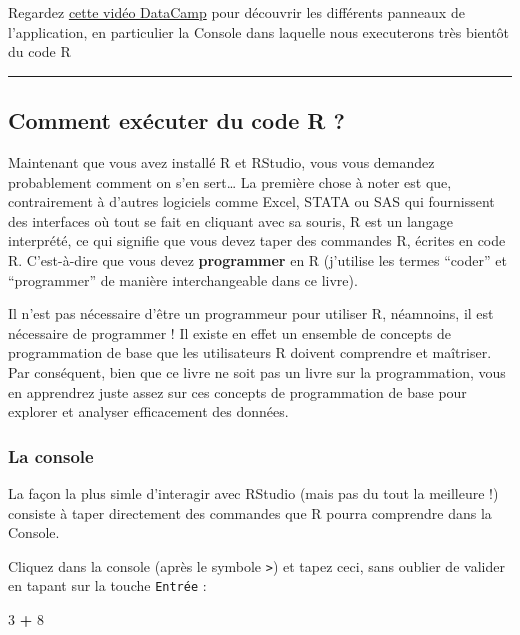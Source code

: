 \documentclass[a4paperpaper,]{article}
\newenvironment{Shaded}{\begin{snugshade}}{\end{snugshade}}
\newcommand{\DecValTok}[1]{\textcolor[rgb]{0.00,0.00,0.81}{#1}}
\newcommand{\StringTok}[1]{\textcolor[rgb]{0.31,0.60,0.02}{#1}}
\newcommand{\OperatorTok}[1]{\textcolor[rgb]{0.81,0.36,0.00}{\textbf{#1}}}
\theoremstyle{definition}
\theoremstyle{definition}
\theoremstyle{definition}
\theoremstyle{remark}
\begin{document}
Regardez
\href{https://campus.datacamp.com/courses/working-with-the-rstudio-ide-part-1/orientation?ex=5}{cette
vidéo DataCamp} pour découvrir les différents panneaux de l'application,
en particulier la Console dans laquelle nous executerons très bientôt du
code R

\begin{center}\rule{0.5\linewidth}{\linethickness}\end{center}

\subsection{Comment exécuter du code R ?}\label{code}

Maintenant que vous avez installé R et RStudio, vous vous demandez
probablement comment on s'en sert\ldots{} La première chose à noter est
que, contrairement à d'autres logiciels comme Excel, STATA ou SAS qui
fournissent des interfaces où tout se fait en cliquant avec sa souris, R
est un langage interprété, ce qui signifie que vous devez taper des
commandes R, écrites en code R. C'est-à-dire que vous devez
\textbf{programmer} en R (j'utilise les termes ``coder'' et
``programmer'' de manière interchangeable dans ce livre).

Il n'est pas nécessaire d'être un programmeur pour utiliser R,
néamnoins, il est nécessaire de programmer ! Il existe en effet un
ensemble de concepts de programmation de base que les utilisateurs R
doivent comprendre et maîtriser. Par conséquent, bien que ce livre ne
soit pas un livre sur la programmation, vous en apprendrez juste assez
sur ces concepts de programmation de base pour explorer et analyser
efficacement des données.

\subsubsection{La console}\label{la-console}

La façon la plus simle d'interagir avec RStudio (mais pas du tout la
meilleure !) consiste à taper directement des commandes que R pourra
comprendre dans la Console.

Cliquez dans la console (après le symbole \texttt{\textgreater{}}) et
tapez ceci, sans oublier de valider en tapant sur la touche
\texttt{Entrée} :

\begin{Shaded}
\begin{Highlighting}[]
\DecValTok{3} \OperatorTok{+}\StringTok{ }\DecValTok{8}
\end{Highlighting}
\end{Shaded}
\end{document}
